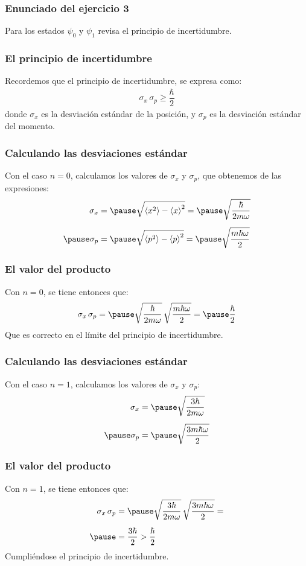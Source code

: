 \documentclass[12pt]{beamer}
\begin{document}
\begin{frame}
\frametitle{Enunciado del ejercicio 3}
Para los estados $\psi_{0}$ y $\psi_{1}$ revisa el principio de incertidumbre.
\end{frame}
\begin{frame}
\frametitle{El principio de incertidumbre}
Recordemos que el principio de incertidumbre, se expresa como:
\pause
\begin{align*}
\sigma_{x} \, \sigma_{p} \geq \dfrac{\hbar}{2}
\end{align*}
\pause
donde $\sigma_{x}$ es la desviación estándar de la posición, y $\sigma_{p}$ es la desviación estándar del momento.
\end{frame}
\begin{frame}
\frametitle{Calculando las desviaciones estándar}
Con el caso $n = 0$, calculamos los valores de $\sigma_{x}$ y $\sigma_{p}$, que obtenemos de las expresiones:
\begin{eqnarray*}
\begin{aligned}
\sigma_{x} &= \pause \sqrt{\expval{x^{2}} - \expval{x}^{2}} = \pause \sqrt{\dfrac{\hbar}{2 m \omega}} \\[0.5em] \pause
\sigma_{p} &= \pause \sqrt{\expval{p^{2}} - \expval{p}^{2}} = \pause \sqrt{\dfrac{m \hbar \omega}{2}}
\end{aligned}
\end{eqnarray*}
\end{frame}
\begin{frame}
\frametitle{El valor del producto}
Con $n = 0$, se tiene entonces que:
\pause
\begin{align*}
\sigma_{x} \, \sigma_{p} = \pause \sqrt{\dfrac{\hbar}{2 m \omega}} \, \sqrt{\dfrac{m \hbar \omega}{2}} = \pause \dfrac{\hbar}{2}
\end{align*}
\pause
Que es correcto en el límite del principio de incertidumbre.
\end{frame}
\begin{frame}
\frametitle{Calculando las desviaciones estándar}
Con el caso $n = 1$, calculamos los valores de $\sigma_{x}$ y $\sigma_{p}$:
\begin{eqnarray*}
\begin{aligned}
\sigma_{x} &= \pause \sqrt{\dfrac{3 \hbar}{2 m \omega}} \\[0.5em] \pause
\sigma_{p} &= \pause \sqrt{\dfrac{3 m \hbar \omega}{2}}
\end{aligned}
\end{eqnarray*}
\end{frame}
\begin{frame}
\frametitle{El valor del producto}
Con $n = 1$, se tiene entonces que:
\pause
\begin{align*}
\sigma_{x} \, \sigma_{p} &= \pause \sqrt{\dfrac{3 \hbar}{2 m \omega}} \, \sqrt{\dfrac{3 m \hbar \omega}{2}} = \\[0.5em] \pause
&= \dfrac{3 \hbar}{2} > \dfrac{\hbar}{2}
\end{align*}
\pause
Cumpliéndose el principio de incertidumbre.
\end{frame}
\end{document}
